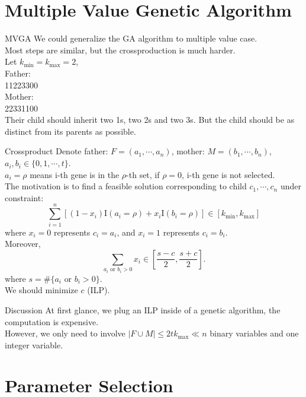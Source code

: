 \documentclass[xcolor=dvipsnames]{beamer}
\begin{document}
\section{Multiple Value Genetic Algorithm}
\begin{frame}{MVGA}
We could generalize the GA algorithm to multiple value case.\\
Most steps are similar, but the crossproduction is much harder.\\
Let $k_{\min}=k_{\max}=2$,\\
Father:\\
11223300\\
Mother:\\
22331100\\
Their child should inherit two 1s, two 2s and two 3s. But the child should be as distinct from its parents as possible.\\
\end{frame}
\begin{frame}{Crossproduct}
Denote father: $F=(a_1,\cdots,a_n)$, mother: $M=(b_1,\cdots,b_n)$, $a_i,b_i\in\{0,1,\cdots,t\}$.\\
$a_i=\rho$ means i-th gene is in the $\rho$-th set, if $\rho=0$, i-th gene is not selected.\\
The motivation is to find a feasible solution corresponding to child $c_1,\cdots,c_n$ under constraint:\\
\[
\sum_{i=1}^n[(1-x_i)\mathrm{I}(a_i=\rho)+x_i\mathrm{I}(b_i=\rho)]\in[k_{\min},k_{\max}]
\]
where $x_i=0$ represents $c_i=a_i$, and $x_i=1$ represents $c_i=b_i$.\\
Moreover,\\
\[\sum_{a_i\text{ or }b_i>0}x_i\in[\frac{s-c}{2},\frac{s+c}{2}].\]
where $s=\#\{a_i\text{ or }b_i>0\}$.\\
We should minimize $c$ (ILP).\\
\end{frame}
\begin{frame}{Discussion}
At first glance, we plug an ILP inside of a genetic algorithm, the computation is expensive.\\
However, we only need to involve $|F\cup M|\leqslant 2tk_{\max}\ll n$ binary variables and one integer variable.\\
\end{frame}
\section{Parameter Selection}
\end{document}
